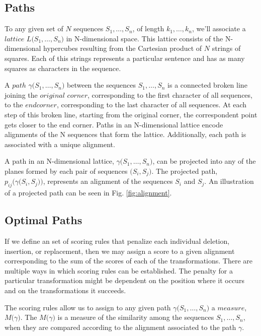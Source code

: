 \documentclass[11pt]{article}
\begin{document}
\subsection{Paths}

To any given set of $N$ sequences $S_1, \dots , S_n$, of length $k_1, \dots , k_n$, we'll associate a $lattice$ $L \big( S_1, \dots, S_n \big) $ in N-dimensional space. This lattice consists of the N-dimensional hypercubes resulting from the Cartesian product of $N$ strings of squares. Each of this strings represents a particular sentence and has as many squares as characters in the sequence. 

A $path$ $\gamma \big(S_1, \dots , S_n \big)$ between the sequences $S_1, \dots , S_n$ is a connected broken line joining the $original$ $corner$, corresponding to the first character of all sequences, to the $end corner$, corresponding to the last character of all sequences. At each step of this broken line, starting from the original corner, the correspondent point gets closer to the end corner. Paths in an N-dimensional lattice encode alignments of the N sequences that form the lattice. Additionally, each path is associated with a unique alignment.

A path in an N-dimensional lattice, $\gamma \big(S_1, \dots , S_n \big)$, can be projected into any of the planes formed by each pair of sequences $\big(S_i, S_j\big)$. The projected path, $p_{ij}\big(\gamma\big(S_i, S_j\big)\big)$, represents an alignment of the sequences $S_i$ and $S_j$. An illustration of a projected path can be seen in Fig. \ref{fig:alignment}.

\subsection{Optimal Paths}

If we define an set of scoring rules that penalize each individual deletion, insertion, or replacement, then we may assign a score to a given alignment corresponding to the sum of the scores of each of the transformations. There are multiple ways in which scoring rules can be established. The penalty for a particular transformation might be dependent on the position where it occurs and on the transformations it succeeds. 

The scoring rules allow us to assign to any given path $\gamma\big(S_1, \dots, S_n\big)$ a $measure$, $M\big(\gamma\big)$. The $M\big(\gamma\big)$ is a measure of the similarity among the sequences $S_1, \dots, S_n$, when they are compared according to the alignment associated to the path $\gamma$. 
\end{document}
